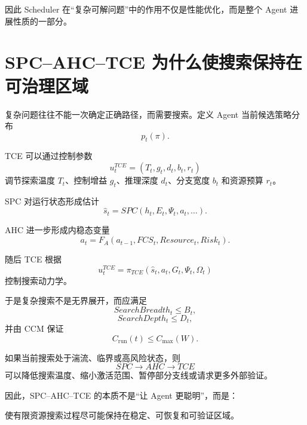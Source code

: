 因此 Scheduler 在“复杂可解问题”中的作用不仅是性能优化，而是整个 Agent 进展性质的一部分。

\section{SPC--AHC--TCE 为什么使搜索保持在可治理区域}

复杂问题往往不能一次确定正确路径，而需要搜索。定义 Agent 当前候选策略分布
\begin{equation}
p_t(\pi).
\end{equation}

TCE 可以通过控制参数
\begin{equation}
u_t^{TCE}
=
(T_t,
g_t,
d_t,
b_t,
r_t)
\end{equation}
调节探索温度 $T_t$、控制增益 $g_t$、推理深度 $d_t$、分支宽度 $b_t$ 和资源预算 $r_t$。

SPC 对运行状态形成估计
\begin{equation}
\hat s_t
=
SPC(h_t,E_t,\Psi_t,a_t,\ldots).
\end{equation}

AHC 进一步形成内稳态变量
\begin{equation}
a_t
=
F_A(
a_{t-1},
FCS_t,
Resource_t,
Risk_t
).
\end{equation}

随后 TCE 根据
\begin{equation}
u_t^{TCE}
=
\pi_{TCE}
(
\hat s_t,
a_t,
G_t,
\Psi_t,
\Omega_t
)
\end{equation}
控制搜索动力学。

于是复杂搜索不是无界展开，而应满足
\begin{equation}
SearchBreadth_t
\leq
B_t,
\end{equation}
\begin{equation}
SearchDepth_t
\leq
D_t,
\end{equation}
并由 CCM 保证
\begin{equation}
C_{\mathrm{run}}(t)
\leq
C_{\max}(W).
\end{equation}

如果当前搜索处于湍流、临界或高风险状态，则
\begin{equation}
SPC
\rightarrow
AHC
\rightarrow
TCE
\end{equation}
可以降低搜索温度、缩小激活范围、暂停部分支线或请求更多外部验证。

因此，SPC--AHC--TCE 的本质不是“让 Agent 更聪明”，而是：

\begin{statementbox}
使有限资源搜索过程尽可能保持在稳定、可恢复和可验证区域。
\end{statementbox}

